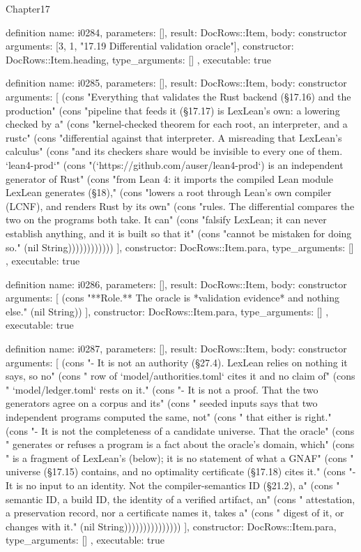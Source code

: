 \begin{lexlean}{Chapter17}
\begin{semanticmodule}
definition{
  name: i0284,
  parameters: [],
  result: DocRows::Item,
  body: constructor{
    arguments: [3, 1, "17.19 Differential validation oracle"],
    constructor: DocRows::Item.heading,
    type_arguments: []
  },
  executable: true
}

definition{
  name: i0285,
  parameters: [],
  result: DocRows::Item,
  body: constructor{
    arguments: [
      (cons "Everything that validates the Rust backend (§17.16) and the production" (cons "pipeline that feeds it (§17.17) is LexLean's own: a lowering checked by a" (cons "kernel-checked theorem for each root, an interpreter, and a rustc" (cons "differential against that interpreter. A misreading that LexLean's calculus" (cons "and its checkers share would be invisible to every one of them. `lean4-prod`" (cons "(`https://github.com/auser/lean4-prod`) is an independent generator of Rust" (cons "from Lean 4: it imports the compiled Lean module LexLean generates (§18)," (cons "lowers a root through Lean's own compiler (LCNF), and renders Rust by its own" (cons "rules. The differential compares the two on the programs both take. It can" (cons "falsify LexLean; it can never establish anything, and it is built so that it" (cons "cannot be mistaken for doing so." (nil String))))))))))))
    ],
    constructor: DocRows::Item.para,
    type_arguments: []
  },
  executable: true
}

definition{
  name: i0286,
  parameters: [],
  result: DocRows::Item,
  body: constructor{
    arguments: [
      (cons "**Role.** The oracle is *validation evidence* and nothing else." (nil String))
    ],
    constructor: DocRows::Item.para,
    type_arguments: []
  },
  executable: true
}

definition{
  name: i0287,
  parameters: [],
  result: DocRows::Item,
  body: constructor{
    arguments: [
      (cons "- It is not an authority (§27.4). LexLean relies on nothing it says, so no" (cons "  row of `model/authorities.toml` cites it and no claim of" (cons "  `model/ledger.toml` rests on it." (cons "- It is not a proof. That the two generators agree on a corpus and its" (cons "  seeded inputs says that two independent programs computed the same, not" (cons "  that either is right." (cons "- It is not the completeness of a candidate universe. That the oracle" (cons "  generates or refuses a program is a fact about the oracle's domain, which" (cons "  is a fragment of LexLean's (below); it is no statement of what a GNAF" (cons "  universe (§17.15) contains, and no optimality certificate (§17.18) cites it." (cons "- It is no input to an identity. Not the compiler-semantics ID (§21.2), a" (cons "  semantic ID, a build ID, the identity of a verified artifact, an" (cons "  attestation, a preservation record, nor a certificate names it, takes a" (cons "  digest of it, or changes with it." (nil String)))))))))))))))
    ],
    constructor: DocRows::Item.para,
    type_arguments: []
  },
  executable: true
}


\end{semanticmodule}
\end{lexlean}
